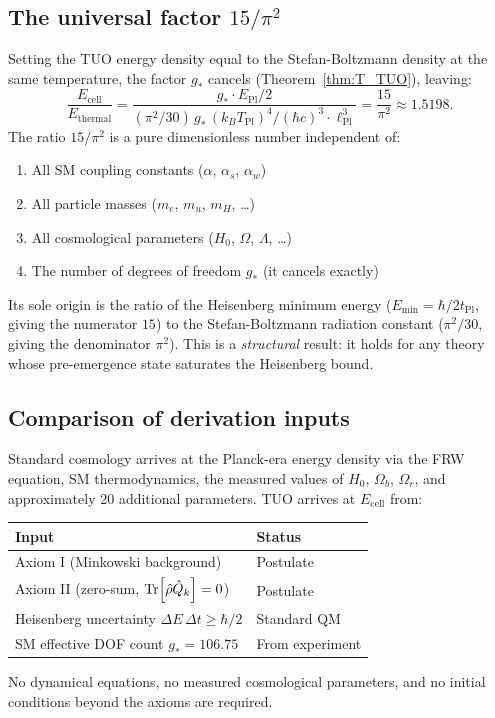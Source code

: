 \documentclass[12pt,a4paper]{article}
\theoremstyle{definition}
\theoremstyle{remark}
\newcommand{\EPl}{E_{\mathrm{Pl}}}
\newcommand{\lPl}{\ell_{\mathrm{Pl}}}
\newcommand{\TPl}{T_{\mathrm{Pl}}}
\newcommand{\gstar}{g_{*}}
\newcommand{\rhohat}{\hat{\rho}}
\newcommand{\Qhat}{\hat{Q}}
\begin{document}
\subsection{The universal factor $15/\pi^2$}

Setting the TUO energy density equal to the Stefan-Boltzmann density at
the same temperature, the factor $\gstar$ cancels (Theorem~\ref{thm:T_TUO}),
leaving:
\begin{equation}
  \frac{E_\mathrm{cell}}{E_\mathrm{thermal}}
  = \frac{\gstar \cdot \EPl/2}
         {(\pi^2/30)\,\gstar\,(k_B\TPl)^4/(\hbar c)^3 \cdot \lPl^3}
  = \frac{15}{\pi^2}
  \approx 1.5198.
\end{equation}
The ratio $15/\pi^2$ is a pure dimensionless number independent of:
\begin{enumerate}[leftmargin=2.5em,label=\textbullet]
  \item All SM coupling constants ($\alpha$, $\alpha_s$, $\alpha_w$)
  \item All particle masses ($m_e$, $m_u$, $m_H$, \ldots)
  \item All cosmological parameters ($H_0$, $\Omega$, $\Lambda$, \ldots)
  \item The number of degrees of freedom $\gstar$ (it cancels exactly)
\end{enumerate}
Its sole origin is the ratio of the Heisenberg minimum energy
($E_\mathrm{min} = \hbar/2t_\mathrm{Pl}$, giving the numerator $15$)
to the Stefan-Boltzmann radiation constant ($\pi^2/30$, giving the
denominator $\pi^2$).
This is a \emph{structural} result: it holds for any theory whose
pre-emergence state saturates the Heisenberg bound.

\subsection{Comparison of derivation inputs}

Standard cosmology arrives at the Planck-era energy density via the
FRW equation, SM thermodynamics, the measured values of $H_0$, $\Omega_b$,
$\Omega_r$, and approximately 20 additional parameters.
TUO arrives at $E_\mathrm{cell}$ from:
\begin{center}
\begin{tabular}{ll}
\toprule
Input & Status \\
\midrule
Axiom I (Minkowski background) & Postulate \\
Axiom II (zero-sum, $\Tr[\rhohat\Qhat_k]=0$) & Postulate \\
Heisenberg uncertainty $\Delta E\,\Delta t \geq \hbar/2$ & Standard QM \\
SM effective DOF count $\gstar = 106.75$ & From experiment \\
\bottomrule
\end{tabular}
\end{center}
No dynamical equations, no measured cosmological parameters, and no
initial conditions beyond the axioms are required.
\end{document}
